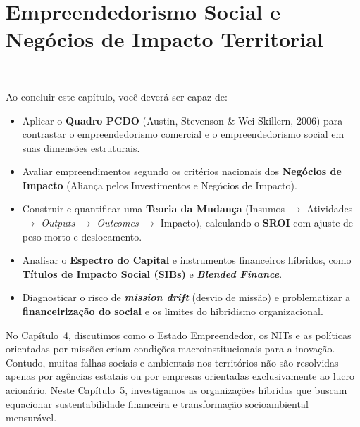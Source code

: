 \chapter{Empreendedorismo Social e Negócios de Impacto Territorial}
\label{cap:unid1_cap05}

\noindent{}\ \tagCritico

\vspace{6pt}

\begin{capObjetivos}
Ao concluir este capítulo, você deverá ser capaz de:
\begin{itemize}[leftmargin=1.4em, itemsep=3pt]
  \item Aplicar o \textbf{Quadro PCDO} (Austin, Stevenson \& Wei-Skillern, 2006) para contrastar o empreendedorismo comercial e o empreendedorismo social em suas dimensões estruturais.
  \item Avaliar empreendimentos segundo os critérios nacionais dos \textbf{Negócios de Impacto} (Aliança pelos Investimentos e Negócios de Impacto).
  \item Construir e quantificar uma \textbf{Teoria da Mudança} (Insumos $\to$ Atividades $\to$ \textit{Outputs} $\to$ \textit{Outcomes} $\to$ Impacto), calculando o \textbf{SROI} com ajuste de peso morto e deslocamento.
  \item Analisar o \textbf{Espectro do Capital} e instrumentos financeiros híbridos, como \textbf{Títulos de Impacto Social (SIBs)} e \textbf{\textit{Blended Finance}}.
  \item Diagnosticar o risco de \textbf{\textit{mission drift}} (desvio de missão) e problematizar a \textbf{financeirização do social} e os limites do hibridismo organizacional.
\end{itemize}
\end{capObjetivos}

\begin{capRevisao}
No Capítulo~4, discutimos como o Estado Empreendedor, os NITs e as políticas orientadas por missões criam condições macroinstitucionais para a inovação. Contudo, muitas falhas sociais e ambientais nos territórios não são resolvidas apenas por agências estatais ou por empresas orientadas exclusivamente ao lucro acionário. Neste Capítulo~5, investigamos as organizações híbridas que buscam equacionar sustentabilidade financeira e transformação socioambiental mensurável.
\end{capRevisao}


